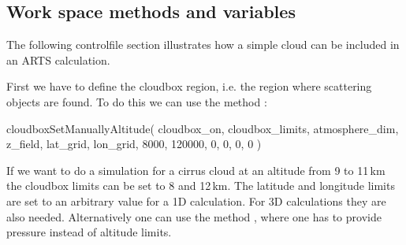 \subsection{Work space methods and variables}

The following controlfile section illustrates how a simple cloud can
be included in an ARTS calculation. 

First we have to define the cloudbox region, i.e. the region where
scattering objects are found. To do this we can use the method
:
\begin{code}
cloudboxSetManuallyAltitude( cloudbox_on, cloudbox_limits,
                             atmosphere_dim, z_field,
                             lat_grid, lon_grid,
                             8000, 120000,
                             0, 0, 0, 0 )
\end{code}
If we want to do a simulation for a
cirrus cloud at an altitude from 9 to 11\,km the cloudbox limits can
be set to 8 and 12\,km. The latitude and longitude limits are set to
an arbitrary value for a 1D calculation. For 3D calculations they are
also needed. Alternatively one can use the method
, where one has to provide pressure
instead of altitude limits. 
 
